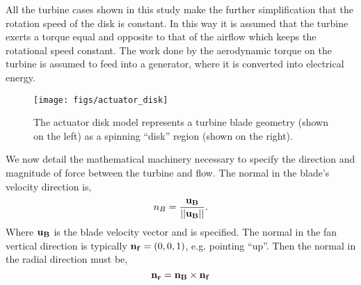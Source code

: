All the turbine cases shown in this study make the further
simplification that the rotation speed of the disk is constant. 
In this way it is assumed that the turbine exerts a torque equal and
opposite to that of the airflow which keeps the rotational speed
constant. The work done by the aerodynamic torque on the
turbine is assumed to feed into a generator, where it is converted into
electrical energy. 


   \begin{figure}[!htb]
    \centering
    \texttt{[image: figs/actuator\_disk]}
     \caption{The actuator disk model represents a turbine blade
    geometry (shown on the left) as a spinning ``disk'' region (shown
    on the right).}
     \label{fig:actuator_disk}
   \end{figure}

We now detail the mathematical machinery necessary to specify the
direction and magnitude of force between the turbine and flow. The
normal in the blade's velocity direction is, 
\begin{equation*}
n_B = \frac{{\bf u_B}}{||{\bf u_B}||}. 
\end{equation*}
Where ${\bf u_B}$ is the blade velocity vector and is specified. The
normal in the fan vertical direction is typically ${\bf n_f} =
\left(0,0,1\right)$, e.g. pointing ``up''. Then the normal in the radial
direction must be,  
\begin{equation*}
{\bf n_r} = {\bf n_B} \times {\bf n_f}
\end{equation*}




